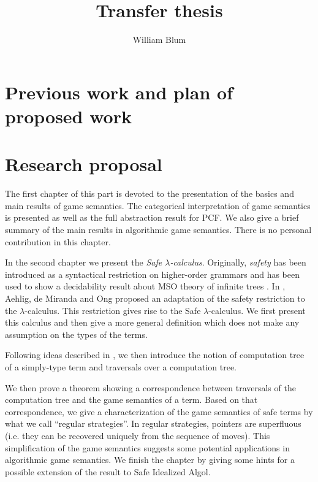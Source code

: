 \documentclass[nocenter,sfbold]{thesis}
\author{William Blum}
\title{Transfer thesis}
\begin{document}
\maketitle \tableofcontents

\part{Previous work and plan of proposed work}




\part{Research proposal}

The first chapter of this part is devoted to the presentation of the
basics and main results of game semantics. The categorical
interpretation of game semantics is presented as well as the full
abstraction result for PCF. We also give a brief summary of the main
results in algorithmic game semantics. There is no personal
contribution in this chapter.

In the second chapter we present the \emph{Safe $\lambda$-calculus}.
Originally, \emph{safety} has been introduced as a syntactical
restriction on higher-order grammars and has been used to show a
decidability result about MSO theory of infinite trees
\citep{KNU02}. In \cite{safety-mirlong2004}, Aehlig, de Miranda and
Ong  proposed an adaptation of the safety restriction to the
$\lambda$-calculus. This restriction gives rise to the Safe
$\lambda$-calculus. We first present this calculus and then give a
more general definition which does not make any assumption on the
types of the terms.

Following ideas described in \cite{OngLics2006}, we then introduce
the notion of computation tree of a simply-type term and traversals
over a computation tree.

We then prove a theorem showing a correspondence between traversals
of the computation tree and the game semantics of a term. Based on
that correspondence, we give a characterization of the game
semantics of safe terms by what we call ``regular strategies''. In
regular strategies, pointers are superfluous (i.e. they can be
recovered uniquely from the sequence of moves). This simplification
of the game semantics suggests some potential applications in
algorithmic game semantics. We finish the chapter by giving some
hints for a possible extension of the result to Safe Idealized
Algol.











         {\protect{}}
\end{document}
